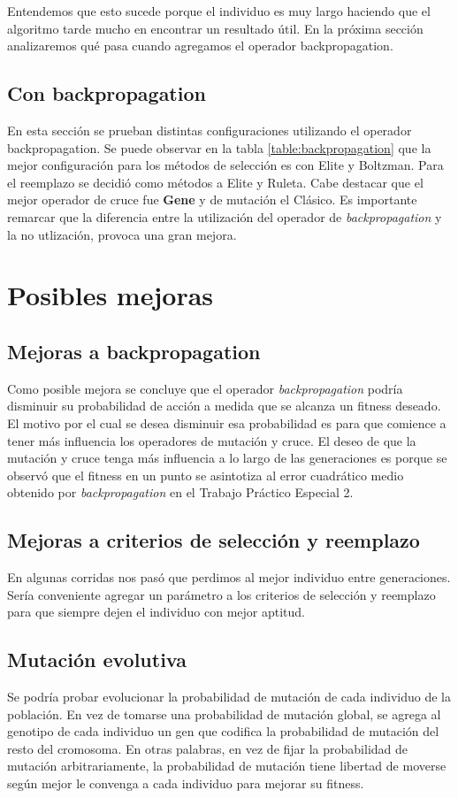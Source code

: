 \documentclass{sig-alternate}
\begin{document}
	Entendemos que esto sucede porque el individuo es muy largo haciendo
	que el algoritmo tarde mucho en encontrar un resultado útil.
	En la próxima sección analizaremos qué pasa cuando agregamos el operador
	backpropagation.

	\subsection{Con backpropagation}
	En esta sección se prueban distintas configuraciones utilizando el
	operador backpropagation.
	Se puede observar en la tabla \ref{table:backpropagation} que la mejor
	configuración para los métodos de selección es con Elite y Boltzman.
	Para el reemplazo se decidió como métodos a Elite y Ruleta.
	Cabe destacar que el mejor operador de cruce fue \textbf{Gene} y de
	mutación el Clásico. Es importante remarcar que la diferencia entre
	la utilización del operador de \textit{backpropagation} y la no
	utlización, provoca una gran mejora.
	
\section{Posibles mejoras}

\subsection{Mejoras a backpropagation}
	Como posible mejora se concluye que el operador \textit{backpropagation}
	podría disminuir su probabilidad de acción a medida que se alcanza un
	fitness deseado.
	El motivo por el cual se desea disminuir esa probabilidad es para que
	comience a tener más influencia los operadores de mutación y cruce.
	El deseo de que la mutación y cruce tenga más influencia a lo largo de
	las generaciones es porque se observó que el fitness en un punto se
	asintotiza al error cuadrático medio obtenido por \textit{backpropagation}
	en el Trabajo Práctico Especial 2.\\

\subsection{Mejoras a criterios de selección y reemplazo}
	En algunas corridas nos pasó que perdimos al mejor individuo entre
	generaciones. Sería conveniente agregar un parámetro a los criterios
	de selección y reemplazo para que siempre dejen el individuo con mejor
	aptitud.

\subsection{Mutación evolutiva}
Se podría probar evolucionar la probabilidad de mutación de cada individuo
de la población.
En vez de tomarse una probabilidad de mutación global, se agrega al
genotipo de cada individuo un gen que codifica la probabilidad
de mutación del resto del cromosoma.
En otras palabras, en vez de fijar la probabilidad de mutación
arbitrariamente, la probabilidad de mutación tiene libertad de
moverse según mejor le convenga a cada individuo para mejorar su fitness.
\end{document}
